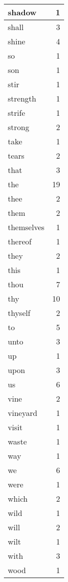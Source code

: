 \begin{center}
\begin{longtable}{l|r}
shadow & 1 \\ \hline
shall & 3 \\ \hline
shine & 4 \\ \hline
so & 1 \\ \hline
son & 1 \\ \hline
stir & 1 \\ \hline
strength & 1 \\ \hline
strife & 1 \\ \hline
strong & 2 \\ \hline
take & 1 \\ \hline
tears & 2 \\ \hline
that & 3 \\ \hline
the & 19 \\ \hline
thee & 2 \\ \hline
them & 2 \\ \hline
themselves & 1 \\ \hline
thereof & 1 \\ \hline
they & 2 \\ \hline
this & 1 \\ \hline
thou & 7 \\ \hline
thy & 10 \\ \hline
thyself & 2 \\ \hline
to & 5 \\ \hline
unto & 3 \\ \hline
up & 1 \\ \hline
upon & 3 \\ \hline
us & 6 \\ \hline
vine & 2 \\ \hline
vineyard & 1 \\ \hline
visit & 1 \\ \hline
waste & 1 \\ \hline
way & 1 \\ \hline
we & 6 \\ \hline
were & 1 \\ \hline
which & 2 \\ \hline
wild & 1 \\ \hline
will & 2 \\ \hline
wilt & 1 \\ \hline
with & 3 \\ \hline
wood & 1 \\ \hline
\end{longtable}
\end{center}



\normalsize



